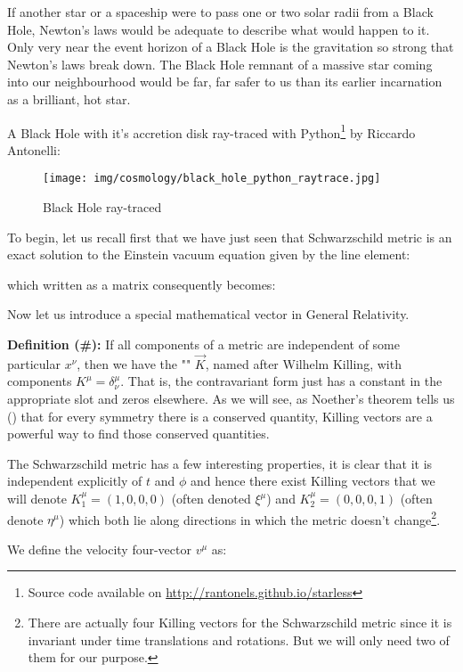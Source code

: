 	If another star or a spaceship were to pass one or two solar radii from a Black Hole, Newton's laws would be adequate to describe what would happen to it. Only very near the event horizon of a Black Hole is the gravitation so strong that Newton's laws break down. The Black Hole remnant of a massive star coming into our neighbourhood would be far, far safer to us than its earlier incarnation as a brilliant, hot star.

	A Black Hole with it's accretion disk ray-traced with Python\footnote{Source code available on  \url{http://rantonels.github.io/starless}} by  Riccardo Antonelli:
	\begin{figure}[H]
		\centering
		\texttt{[image: img/cosmology/black\_hole\_python\_raytrace.jpg]}
		\caption{Black Hole ray-traced }
	\end{figure}
	
	To begin, let us recall first that we have just seen that Schwarzschild metric is an exact solution to the Einstein vacuum equation given by the line element:
	
	which written as a matrix consequently becomes:
	
	Now let us introduce a special mathematical vector in General Relativity. 
	
	\textbf{Definition (\#\mydef):} If all components of a metric are independent of some particular $x^\nu$, then we have the "" $\vec{K}$, named after Wilhelm Killing, with components $K^\mu=\delta_\nu^\mu$. That is, the contravariant form just has a constant in the appropriate slot and zeros elsewhere. As we will see, as Noether's theorem tells us () that for every symmetry there is a conserved quantity, Killing vectors are a powerful way to find those conserved quantities.
	
	The Schwarzschild metric has a few interesting properties, it is clear that it is independent explicitly of $t$ and $\phi$ and hence there exist Killing vectors that we will denote $K_1^\mu=(1,0,0,0)$ (often denoted $\xi^\mu$) and $K_2^\mu=(0,0,0,1)$ (often denote $\eta^\mu$) which both lie along directions in which the metric doesn't change\footnote{There are actually four Killing vectors for the Schwarzschild metric since it is invariant under time translations and rotations. But we will only need two of them for our purpose.}.
	
	We define the velocity four-vector $v^\mu$ as:
	
